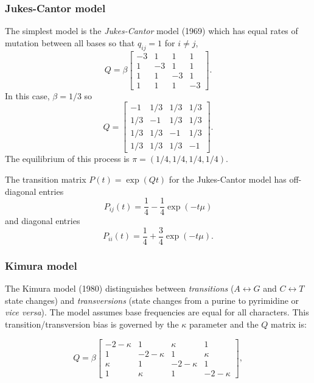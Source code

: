 \documentclass[11pt]{article}
\begin{document}
\subsubsection{Jukes-Cantor model}

 The simplest model  is the {\em Jukes-Cantor} model  (1969) which has equal rates of mutation between all bases so that  $q_{ij} = 1$ for $i \neq j$, 
   \begin{equation*}
Q = \beta \begin{bmatrix}
-3 & 1 & 1 & 1 \\
  1 & -3 & 1 & 1 \\
  1  & 1  &  -3 & 1  \\
  1 & 1 & 1 & -3
 \end{bmatrix}.
\end{equation*}
In this case, $\beta = 1/3$ so 
   \begin{equation*}
Q =  \begin{bmatrix}
-1 & 1/3 &  1/3  &  1/3  \\
   1/3  & -1 &  1/3  &  1/3  \\
   1/3   &  1/3   &  -1 &  1/3   \\
   1/3  &  1/3  &  1/3  & -1
 \end{bmatrix}.
\end{equation*}
The equilibrium of this process is  $\pi = (1/4,1/4,1/4,1/4)$.  

The transition matrix $P(t) = \exp(Qt)$ for the Jukes-Cantor model  has off-diagonal entries
\[P_{ij}(t) = \frac14 - \frac14 \exp\left( - t \mu\right)\] and diagonal entries
\[P_{ii}(t) = \frac14 + \frac34 \exp\left( - t \mu\right).\] 

\subsubsection{Kimura model}

The Kimura model (1980) distinguishes between {\it transitions} ($A \longleftrightarrow G$ and $C \longleftrightarrow T$ state changes) and {\it transversions} (state changes from a  purine to pyrimidine or {\it vice versa}). 
The model assumes base frequencies are equal for all characters.
This transition/transversion bias is governed by the $\kappa$ parameter and the $Q$ matrix is:


  \begin{equation*}
Q =  \beta \begin{bmatrix}
-2-\kappa & 1 & \kappa & 1 \\
  1 & -2-\kappa & 1 & \kappa \\
  \kappa & 1  &  -2-\kappa & 1  \\
  1 & \kappa & 1 & -2-\kappa
 \end{bmatrix},
\end{equation*} 
\end{document}
